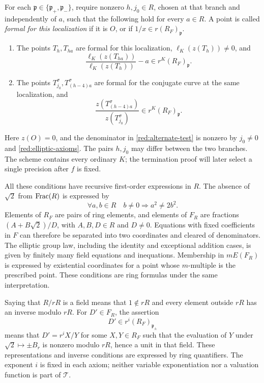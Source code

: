 For each \(\mathfrak p\in\{\mathfrak p_+,\mathfrak p_-\}\), require
nonzero \(h,j_0\in R\), chosen at that branch and independently of
\(a\), such that the following hold for every \(a\in R\). A point is
called \emph{formal for this localization} if it is \(O\), or if
\(1/x\in r(R_F)_{\mathfrak p}\).
\begin{enumerate}[label=(\roman*),leftmargin=*]
\item The points \(T_h,T_{ha}\) are formal for this localization,
\(\ell_K(z(T_h))\ne0\), and
\begin{equation}\label{red:primary-test}
 \frac{\ell_K(z(T_{ha}))}{\ell_K(z(T_h))}-a
                            \in r^K(R_F)_{\mathfrak p}.
\end{equation}
\item The points \(T_{j_0}^{\sigma},T_{(h-4)a}^{\sigma}\) are formal
for the conjugate curve at the same localization, and
\begin{equation}\label{red:alternate-test}
 \frac{z(T_{(h-4)a}^{\sigma})}{z(T_{j_0}^{\sigma})}
                            \in r^K(R_F)_{\mathfrak p}.
\end{equation}
\end{enumerate}
Here \(z(O)=0\), and the denominator in
\eqref{red:alternate-test} is nonzero by \(j_0\ne0\) and
\eqref{red:elliptic-axioms}. The pairs \(h,j_0\) may differ between
the two branches. The scheme contains every ordinary \(K\); the
termination proof will later select a single precision after \(f\)
is fixed.

All these conditions have recursive first-order expressions in \(R\).
The absence of \(\sqrt2\) from \(\operatorname{Frac}(R)\) is expressed by
\[
       \forall a,b\in R\quad b\ne0\Longrightarrow a^2\ne2b^2.
\]
Elements of \(R_F\) are pairs of ring elements, and elements of
\(F_R\) are fractions \((A+B\sqrt2)/D\), with \(A,B,D\in R\)
and \(D\ne0\). Equations with fixed coefficients in \(F\) can
therefore be separated into two coordinates and cleared of denominators.
The elliptic group law, including the identity and exceptional addition
cases, is given by finitely many field equations and inequations.
Membership in \(mE(F_R)\) is expressed by existential coordinates for
a point whose \(m\)-multiple is the prescribed point. These conditions
are ring formulas under the same interpretation.

Saying that \(R/rR\) is a field means that \(1\notin rR\) and every
element outside \(rR\) has an inverse modulo \(rR\). For \(D'\in F_R\),
the assertion
\begin{equation}\label{red:localization-definition}
                         D'\in r^i(R_F)_{\mathfrak p_\pm}
\end{equation}
means that \(D'=r^iX/Y\) for some \(X,Y\in R_F\) such that the
evaluation of \(Y\) under \(\sqrt2\mapsto\pm B_r\) is nonzero modulo
\(rR\), hence a unit in that field. These representations and inverse conditions
are expressed by ring quantifiers. The exponent \(i\) is fixed in
each axiom; neither variable exponentiation nor a valuation function
is part of \(\mathcal T\).

